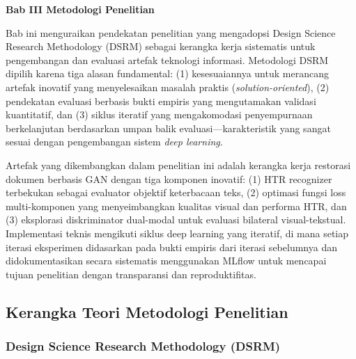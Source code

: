 \documentclass[12pt,a4paper]{article}
\begin{document}
\setcounter{page}{61}

\sloppy

\vspace{2cm}
\begin{center}
{\fontsize{14}{16.8}\selectfont\textbf{Bab III \quad Metodologi Penelitian}}\\[1em]
\end{center}
\label{sec:metodologi}
\setcounter{section}{3}
\setcounter{subsection}{0}
\setcounter{table}{0}
\setcounter{figure}{0}
\vspace{2em}

Bab ini menguraikan pendekatan penelitian yang mengadopsi Design Science Research Methodology (DSRM) sebagai kerangka kerja sistematis untuk pengembangan dan evaluasi artefak teknologi informasi. Metodologi DSRM dipilih karena tiga alasan fundamental: (1) kesesuaiannya untuk merancang artefak inovatif yang menyelesaikan masalah praktis (\textit{solution-oriented}), (2) pendekatan evaluasi berbasis bukti empiris yang mengutamakan validasi kuantitatif, dan (3) siklus iteratif yang mengakomodasi penyempurnaan berkelanjutan berdasarkan umpan balik evaluasi---karakteristik yang sangat sesuai dengan pengembangan sistem \textit{deep learning}.

Artefak yang dikembangkan dalam penelitian ini adalah kerangka kerja restorasi dokumen berbasis GAN dengan tiga komponen inovatif: (1) HTR recognizer terbekukan sebagai evaluator objektif keterbacaan teks, (2) optimasi fungsi loss multi-komponen yang menyeimbangkan kualitas visual dan performa HTR, dan (3) eksplorasi diskriminator dual-modal untuk evaluasi bilateral visual-tekstual. Implementasi teknis mengikuti siklus deep learning yang iteratif, di mana setiap iterasi eksperimen didasarkan pada bukti empiris dari iterasi sebelumnya dan didokumentasikan secara sistematis menggunakan MLflow untuk mencapai tujuan penelitian dengan transparansi dan reproduktifitas.
\vspace{1em}

\subsection{Kerangka Teori Metodologi Penelitian}
\label{subsec:kerangka-teori}
\vspace{0.8em}

\subsubsection{Design Science Research Methodology (DSRM)}
\end{document}
